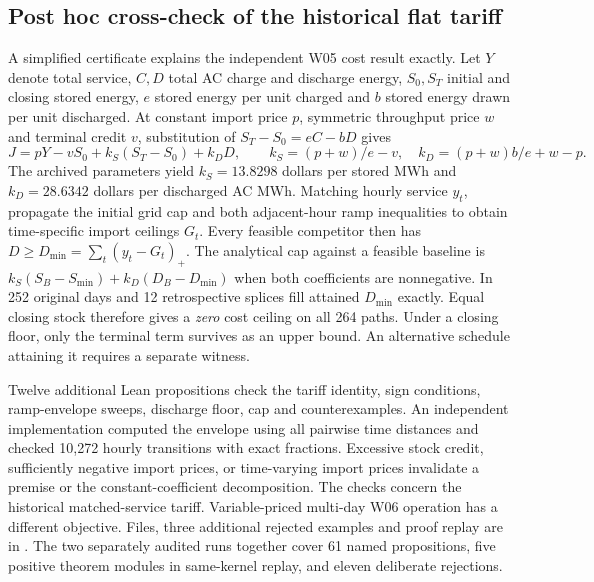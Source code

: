 \documentclass[10pt,letterpaper]{article}
\begin{document}
\subsection*{Post hoc cross-check of the historical flat tariff}
A simplified certificate explains the independent W05 cost result exactly. Let $Y$ denote total service, $C,D$ total AC charge and discharge energy, $S_0,S_T$ initial and closing stored energy, $e$ stored energy per unit charged and $b$ stored energy drawn per unit discharged. At constant import price $p$, symmetric throughput price $w$ and terminal credit $v$, substitution of $S_T-S_0=eC-bD$ gives
\[
 J=pY-vS_0+k_S(S_T-S_0)+k_DD,\qquad
 k_S=(p+w)/e-v,\quad k_D=(p+w)b/e+w-p .
\]
The archived parameters yield $k_S=13.8298$ dollars per stored MWh and $k_D=28.6342$ dollars per discharged AC MWh. Matching hourly service $y_t$, propagate the initial grid cap and both adjacent-hour ramp inequalities to obtain time-specific import ceilings $G_t$. Every feasible competitor then has $D\geq D_{\min}=\sum_t(y_t-G_t)_+$. The analytical cap against a feasible baseline is $k_S(S_B-S_{\min})+k_D(D_B-D_{\min})$ when both coefficients are nonnegative. In 252 original days and 12 retrospective splices fill attained $D_{\min}$ exactly. Equal closing stock therefore gives a \emph{zero} cost ceiling on all 264 paths. Under a closing floor, only the terminal term survives as an upper bound. An alternative schedule attaining it requires a separate witness.

Twelve additional Lean propositions check the tariff identity, sign conditions, ramp-envelope sweeps, discharge floor, cap and counterexamples. An independent implementation computed the envelope using all pairwise time distances and checked 10,272 hourly transitions with exact fractions. Excessive stock credit, sufficiently negative import prices, or time-varying import prices invalidate a premise or the constant-coefficient decomposition. The checks concern the historical matched-service tariff. Variable-priced multi-day W06 operation has a different objective. Files, three additional rejected examples and proof replay are in . The two separately audited runs together cover 61 named propositions, five positive theorem modules in same-kernel replay, and eleven deliberate rejections.
\end{document}
